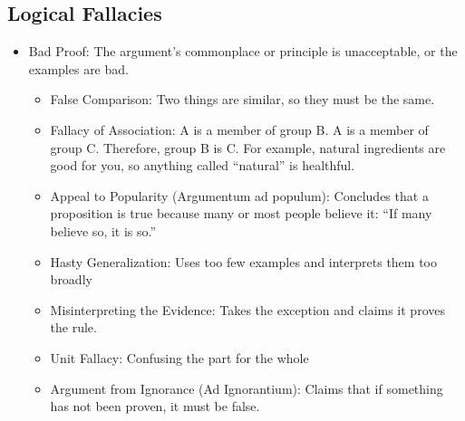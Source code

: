 \subsection{Logical Fallacies}
\begin{itemize}
	\item Bad Proof: The argument's commonplace or principle is unacceptable, or the examples are bad.
	\begin{itemize}
			\item False Comparison: Two things are similar, so they must be the same.
			\item Fallacy of Association: A is a member of group B. A is a member of group C. Therefore, group B is C. For example, natural ingredients are good for you, so anything called ``natural'' is healthful.
			\item Appeal to Popularity (Argumentum ad populum): Concludes that a proposition is true because many or most people believe it: ``If many believe so, it is so.''
			\item Hasty Generalization: Uses too few examples and interprets them too broadly
			\item Misinterpreting the Evidence: Takes the exception and claims it proves the rule.
			\item Unit Fallacy: Confusing the part for the whole
			\item Argument from Ignorance (Ad Ignorantium): Claims that if something has not been proven, it must be false.	
	\end{itemize}


\end{itemize}
